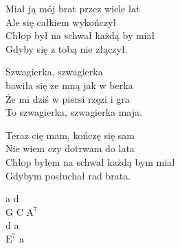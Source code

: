 \begin{text}
    Miał ją mój brat przez wiele lat\\
    Ale się całkiem wykończył\\
    Chłop był na schwał każdą by miał\\
    Gdyby się z tobą nie złączył.

    \vin Szwagierka, szwagierka\\
    \vin bawiła się ze mną jak w berka\\
    \vin Że mi dziś w piersi rzęzi i gra\\
    \vin To szwagierka, szwagierka maja.

    Teraz cię mam, kończę się sam\\
    Nie wiem czy dotrwam do lata\\
    Chłop byłem na schwał każdą bym miał\\
    Gdybym posłuchał rad brata.
\end{text}
\begin{chord}
    a d\\
    G C $\mathrm{A^7}$\\
    d a\\
    $\mathrm{E^7}$ a
\end{chord}
